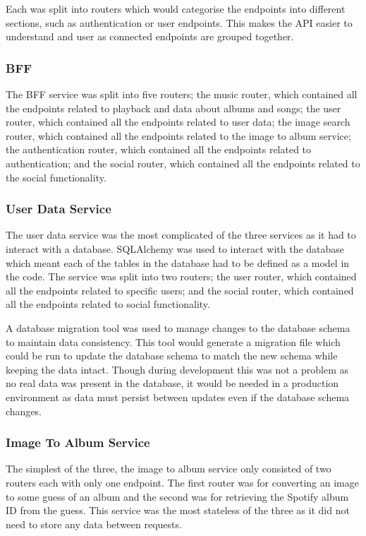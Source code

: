 Each was split into routers which would categorise the endpoints into different sections, such as authentication or user endpoints. This makes the API easier to understand and user as connected endpoints are grouped together.


\subsubsection{BFF}
The BFF service was split into five routers; the music router, which contained all the endpoints related to playback and data about albums and songs; the user router, which contained all the endpoints related to user data; the image search router, which contained all the endpoints related to the image to album service; the authentication router, which contained all the endpoints related to authentication; and the social router, which contained all the endpoints related to the social functionality.

\subsubsection{User Data Service}
The user data service was the most complicated of the three services as it had to interact with a database. SQLAlchemy was used to interact with the database which meant each of the tables in the database had to be defined as a model in the code. The service was split into two routers; the user router, which contained all the endpoints related to specific users; and the social router, which contained all the endpoints related to social functionality.

A database migration tool was used to manage changes to the database schema to maintain data consistency. This tool would generate a migration file which could be run to update the database schema to match the new schema while keeping the data intact. Though during development this was not a problem as no real data was present in the database, it would be needed in a production environment as data must persist between updates even if the database schema changes.

\subsubsection{Image To Album Service}
The simplest of the three, the image to album service only consisted of two routers each with only one endpoint. The first router was for converting an image to some guess of an album and the second was for retrieving the Spotify album ID from the guess. This service was the most stateless of the three as it did not need to store any data between requests.

